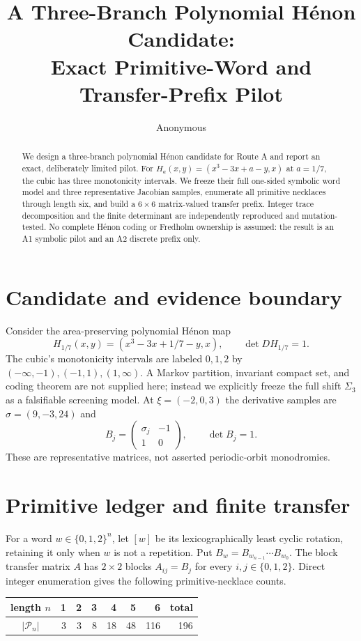 \documentclass[10pt]{article}
\title{A Three-Branch Polynomial H\'enon Candidate:\\
Exact Primitive-Word and Transfer-Prefix Pilot}
\author{Anonymous}
\date{}
\begin{document}
\maketitle
\begin{abstract}
We design a three-branch polynomial H\'enon candidate for Route A and report
an exact, deliberately limited pilot.  For
$H_a(x,y)=(x^3-3x+a-y,x)$ at $a=1/7$, the cubic has three monotonicity
intervals.  We freeze their full one-sided symbolic word model and three
representative Jacobian samples, enumerate all primitive necklaces through
length six, and build a $6\times6$ matrix-valued transfer prefix.  Integer
trace decomposition and the finite determinant are independently reproduced
and mutation-tested.  No complete H\'enon coding or Fredholm ownership is
assumed: the result is an A1 symbolic pilot and an A2 discrete prefix only.
\end{abstract}

\section{Candidate and evidence boundary}
Consider the area-preserving polynomial H\'enon map
\[
 H_{1/7}(x,y)=(x^3-3x+1/7-y,x),\qquad
 \det DH_{1/7}=1.
\]
The cubic's monotonicity intervals are labeled $0,1,2$ by
$( -\infty,-1),(-1,1),(1,\infty)$.  A Markov partition, invariant compact
set, and coding theorem are not supplied here; instead we explicitly freeze
the full shift $\Sigma_3$ as a falsifiable screening model.  At
$\xi=(-2,0,3)$ the derivative samples are $\sigma=(9,-3,24)$ and
\[
 B_j=\begin{pmatrix}\sigma_j&-1\\1&0\end{pmatrix},\qquad \det B_j=1.
\]
These are representative matrices, not asserted periodic-orbit monodromies.

\section{Primitive ledger and finite transfer}
For a word $w\in\{0,1,2\}^n$, let $[w]$ be its lexicographically least cyclic
rotation, retaining it only when $w$ is not a repetition.  Put
$B_w=B_{w_{n-1}}\cdots B_{w_0}$.  The block transfer matrix $A$ has
$2\times2$ blocks $A_{ij}=B_j$ for every $i,j\in\{0,1,2\}$.  Direct integer
enumeration gives the following primitive-necklace counts.
\begin{center}
\begin{tabular}{c|rrrrrr|r}
\toprule
length $n$ & 1&2&3&4&5&6&total\\
\midrule
$|\mathcal P_n|$ &3&3&8&18&48&116&196\\
\bottomrule
\end{tabular}
\end{center}
\end{document}
